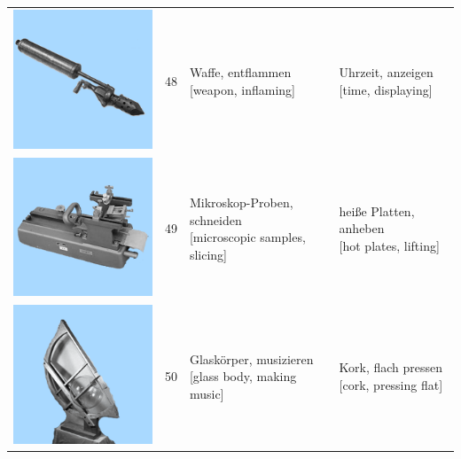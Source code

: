 \documentclass[
  english,
  man,floatsintext]{apa7}
\begin{document}
\begin{center}
\begin{ThreePartTable}
{\begin{longtable}{llll}
\includegraphics[valign=c, scale=0.23]{../materials/unfamiliar/48.png} & 48 & \makecell[l]{Waffe, entflammen\\{[weapon, inflaming]}} & \makecell[l]{Uhrzeit, anzeigen\\{[time, displaying]}}\\
\includegraphics[valign=c, scale=0.23]{../materials/unfamiliar/49.png} & 49 & \makecell[l]{Mikroskop-Proben, schneiden\\{[microscopic samples, slicing]}} & \makecell[l]{heiße Platten, anheben\\{[hot plates, lifting]}}\\
\includegraphics[valign=c, scale=0.23]{../materials/unfamiliar/50.png} & 50 & \makecell[l]{Glaskörper, musizieren\\{[glass body, making music]}} & \makecell[l]{Kork, flach pressen\\{[cork, pressing flat]}}\\

\end{longtable}}
\end{ThreePartTable}
\end{center}
\end{document}
